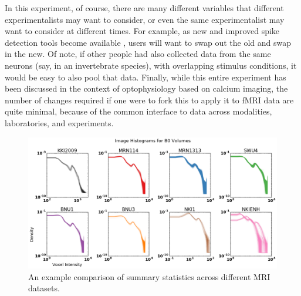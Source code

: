 In this experiment, of course, there are many different variables that different experimentalists may want to consider, or even the same experimentalist may want to consider at different times.  For example, as new and improved spike detection tools become available \cite{Vogelstein2010b}, users will want to swap out the old and swap in the new.  Of note, if other people had also collected data from the same neurons (say, in an invertebrate species), with overlapping stimulus conditions, it would be easy to also pool that data. Finally, while this entire experiment has been discussed in the context of optophysiology based on calcium imaging, the number of changes required if one were to fork this to apply it to fMRI data are quite minimal, because of the common interface to data across modalities, laboratories, and experiments.


\begin{figure}%
\includegraphics[width=1\textwidth]{multi_b0s_colourful.png}
\caption{An example comparison of summary statistics across different MRI datasets.
}
\label{f:mri}
\end{figure}



